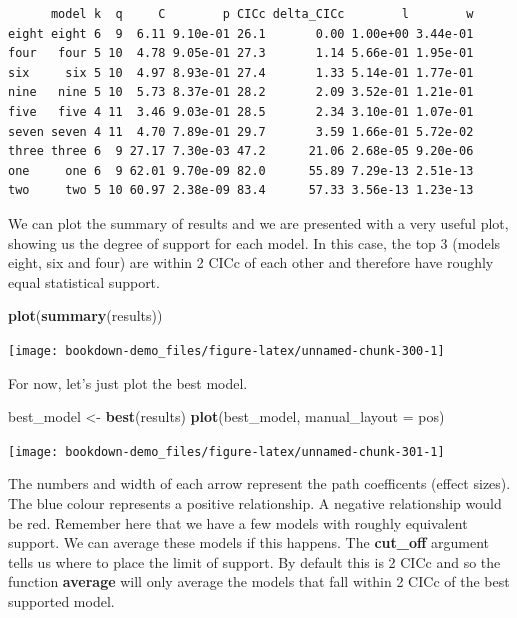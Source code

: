 \documentclass[
]{book}
\newenvironment{Shaded}{\begin{snugshade}}{\end{snugshade}}
\newcommand{\DataTypeTok}[1]{\textcolor[rgb]{0.13,0.29,0.53}{#1}}
\newcommand{\KeywordTok}[1]{\textcolor[rgb]{0.13,0.29,0.53}{\textbf{#1}}}
\newcommand{\NormalTok}[1]{#1}
\newcommand{\StringTok}[1]{\textcolor[rgb]{0.31,0.60,0.02}{#1}}
\begin{document}
\begin{verbatim}
      model k  q     C        p CICc delta_CICc        l        w
eight eight 6  9  6.11 9.10e-01 26.1       0.00 1.00e+00 3.44e-01
four   four 5 10  4.78 9.05e-01 27.3       1.14 5.66e-01 1.95e-01
six     six 5 10  4.97 8.93e-01 27.4       1.33 5.14e-01 1.77e-01
nine   nine 5 10  5.73 8.37e-01 28.2       2.09 3.52e-01 1.21e-01
five   five 4 11  3.46 9.03e-01 28.5       2.34 3.10e-01 1.07e-01
seven seven 4 11  4.70 7.89e-01 29.7       3.59 1.66e-01 5.72e-02
three three 6  9 27.17 7.30e-03 47.2      21.06 2.68e-05 9.20e-06
one     one 6  9 62.01 9.70e-09 82.0      55.89 7.29e-13 2.51e-13
two     two 5 10 60.97 2.38e-09 83.4      57.33 3.56e-13 1.23e-13
\end{verbatim}

We can plot the summary of results and we are presented with a very useful plot, showing us the degree of support for each model. In this case, the top 3 (models eight, six and four) are within 2 CICc of each other and therefore have roughly equal statistical support.

\begin{Shaded}
\begin{Highlighting}[]
\KeywordTok{plot}\NormalTok{(}\KeywordTok{summary}\NormalTok{(results))}
\end{Highlighting}
\end{Shaded}

\begin{center}\texttt{[image: bookdown-demo\_files/figure-latex/unnamed-chunk-300-1]} \end{center}

For now, let's just plot the best model.

\begin{Shaded}
\begin{Highlighting}[]
\NormalTok{best\_model \textless{}{-}}\StringTok{ }\KeywordTok{best}\NormalTok{(results)}
\KeywordTok{plot}\NormalTok{(best\_model, }\DataTypeTok{manual\_layout =}\NormalTok{ pos)}
\end{Highlighting}
\end{Shaded}

\begin{center}\texttt{[image: bookdown-demo\_files/figure-latex/unnamed-chunk-301-1]} \end{center}

The numbers and width of each arrow represent the path coefficents (effect sizes). The blue colour represents a positive relationship. A negative relationship would be red. Remember here that we have a few models with roughly equivalent support. We can average these models if this happens. The \textbf{cut\_off} argument tells us where to place the limit of support. By default this is 2 CICc and so the function \textbf{average} will only average the models that fall within 2 CICc of the best supported model.
\end{document}
